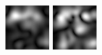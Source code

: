 \begin{figure}[ht]
\begin{center}
 \includegraphics[width=\columnwidth/9]{ch4/figures/mag_1_1.jpg}
 \includegraphics[width=\columnwidth/9]{ch4/figures/mag_1_2.jpg}

\end{center}
\end{figure}
